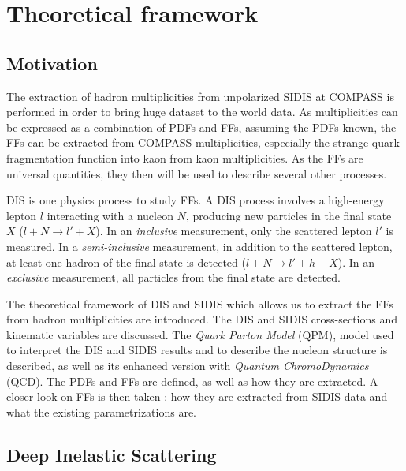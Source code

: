 
\chapter{Theoretical framework} %

\label{ch:thfw} %


\section{Motivation}

The extraction of hadron multiplicities from unpolarized SIDIS at COMPASS is performed in order to bring huge dataset to the world data. As multiplicities can be expressed as a combination of PDFs and FFs, assuming the PDFs known, the FFs can be extracted from COMPASS multiplicities, especially the strange quark fragmentation function into kaon from kaon multiplicities. As the FFs are universal quantities, they then will be used to describe several other processes.

DIS is one physics process to study FFs. A DIS process involves a high-energy lepton $l$ interacting with a nucleon $N$, producing new particles in the final state $X$ ($l+N \rightarrow l'+X$). In an \textit{inclusive} measurement, only the scattered lepton $l'$ is measured. In a \textit{semi-inclusive} measurement, in addition to the scattered lepton, at least one hadron of the final state is detected ($l+N \rightarrow l'+h+X$). In an \textit{exclusive} measurement, all particles from the final state are detected.

The theoretical framework of DIS and SIDIS which allows us to extract the FFs from hadron multiplicities are introduced. The DIS and SIDIS cross-sections and kinematic variables are discussed. The \textit{Quark Parton Model} (QPM), model used to interpret the DIS and SIDIS results and to describe the nucleon structure is described, as well as its enhanced version with \textit{Quantum ChromoDynamics} (QCD). The PDFs and FFs are defined, as well as how they are extracted. A closer look on FFs is then taken : how they are extracted from SIDIS data and what the existing parametrizations are.

\section{Deep Inelastic Scattering}

